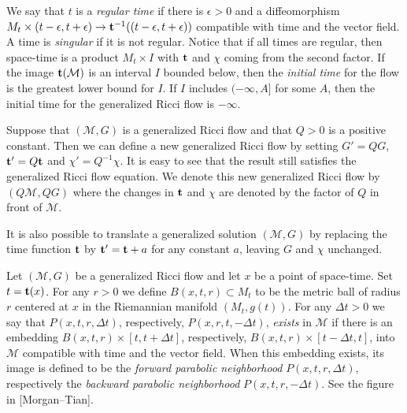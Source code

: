 \begin{definition}\label{def:regular-singular-time}


We say that $t$ is a {\em regular time} if there is $\epsilon>0$ and
a diffeomorphism $M_{t}\times (t-\epsilon,t+\epsilon)\to {\bf
t}^{-1}((t-\epsilon,t+\epsilon))$ compatible with time
and the vector field. A time is {\em singular} if it is not regular.
Notice that if all times are regular, then space-time is a product
$M_{t}\times I$ with ${\bf t}$ and $\chi$ coming from the second
factor. If the image ${\bf t}({\mathcal M})$ is an interval $I$
bounded below, then the {\em initial time} for the flow is the
greatest lower bound for $I$. If $I$ includes $(-\infty,A]$ for some
$A$, then the initial time for the generalized Ricci flow is
$-\infty$.
\end{definition}



\begin{definition}\label{def:scaling-translation}


Suppose that $({\mathcal M},G)$ is a generalized Ricci flow and that
$Q>0$ is a positive constant. Then we can define a new generalized
Ricci flow by setting $G'=QG$, ${\bf t'}=Q{\bf t}$ and
$\chi'=Q^{-1}\chi$. It is easy to see that the result still
satisfies the generalized Ricci flow equation. We denote this new
generalized Ricci flow by $(Q{\mathcal M},QG)$ where the changes in
${\bf t}$ and $\chi$ are denoted by the factor of $Q$ in front of
${\mathcal M}$.

It is also possible to translate a generalized solution $({\mathcal M},G)$ by
replacing the time function ${\bf t}$ by ${\bf t'}={\bf t}+a$ for any constant
$a$, leaving $G$ and $\chi$ unchanged.
\end{definition}

\begin{definition}\label{def:parabolic-neighborhoods}


Let $({\mathcal M},G)$ be a generalized Ricci flow and let $x$ be a
point of space-time. Set $t={\bf t}(x)$. For any  $r>0$ we define
$B(x,t,r)\subset M_t$ to be the metric ball of radius $r$ centered
at $x$ in the Riemannian manifold $(M_t,g(t))$. For any $\Delta t>0$
we say that $P(x,t,r,\Delta t)$,
respectively, $P(x,r,t,-\Delta
t)$, {\em exists} in ${\mathcal M}$ if there is an embedding
$B(x,t,r)\times [t,t+\Delta t]$, respectively, $B(x,t,r)\times
[t-\Delta t,t]$, into ${\mathcal M}$ compatible with time and the
vector field. When this embedding exists, its image is defined to be the {\em
forward parabolic neighborhood}
$P(x,t,r,\Delta t)$, respectively the {\em backward parabolic
neighborhood} $P(x,t,r,-\Delta t)$.
See the figure in [Morgan--Tian].
\end{definition}
